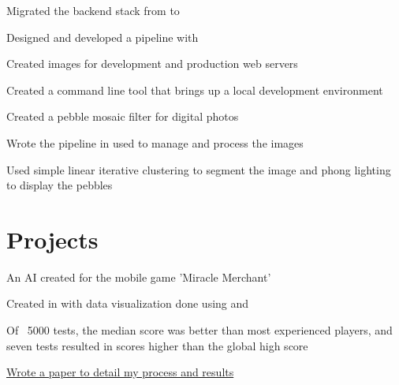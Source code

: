 \documentclass[]{deedy-resume-openfont}
\begin{document}
\begin{minipage}[t]{0.66\textwidth}
\begin{tightemize}
\item Migrated the backend stack from to 

\item Designed and developed a  pipeline with 

\item Created images for development and production web servers

\item Created a command line tool that brings up a local development environment

\end{tightemize}
\sectionsep
{}
\begin{tightemize}

\item Created a pebble mosaic filter for digital photos

\item Wrote the pipeline in used to manage and process the images

\item Used simple linear iterative clustering to segment the image and phong lighting to display the pebbles

\end{tightemize}
\sectionsep

\section{Projects}

\begin{tightemize}

\item An AI created for the mobile game 'Miracle Merchant'

\item Created in with data visualization done using and 

\item Of ~5000 tests, the median score was better than most experienced players, and seven tests resulted in scores higher than the global high score

\item \href{https://github.com/AngelOnFira/Miracle-Merchant-AI/blob/master/Miracle_Merchant.pdf}{Wrote a paper to detail my process and results}


\end{tightemize}
\end{minipage}
\end{document}
